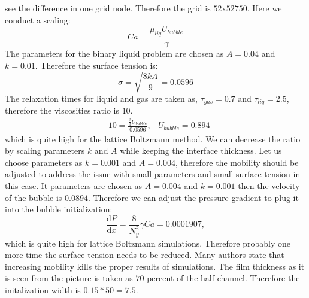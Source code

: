 \documentclass{article}
\begin{document}
see the difference in one grid node. Therefore the grid is $52\mathrm{x}52\mathrm{750}$. Here we
conduct a scaling:
\begin{equation}
Ca=\frac{\mu_{liq} U_{bubble}}{\gamma}
\end{equation}
The parameters for the binary liquid problem are chosen as $A=0.04$ and $k=0.01$. Therefore the
surface tension is:
\begin{equation}
\sigma = \sqrt{\frac{8 k A}{9}}=0.0596
\end{equation}
The relaxation times for liquid and gas are taken as, $\tau_{gas}=0.7$ and $\tau_{liq}=2.5$,
therefore the viscosities ratio is $10$.
\begin{equation}
\begin{aligned}
&10=\frac{\frac{2}{3} U_{bubble}}{0.0596},
&U_{bubble}=0.894
\end{aligned}
\end{equation}
which is quite high for the lattice Boltzmann method. We can decrease the ratio by scaling
parameters $k$ and $A$ while keeping the interface thickness. Let us choose parameters as $k=0.001$
and $A=0.004$, therefore the mobility should be adjusted to address the issue with small parameters
and small surface tension in this case. It parameters are chosen as $A=0.004$ and $k=0.001$ then
the velocity of the bubble is  $0.0894$. Therefore we can adjust the pressure gradient to plug it
into the bubble initialization:
\begin{equation}
\frac{\mathrm{d}P}{\mathrm{d}x}=\frac{8}{N_y^2} \gamma Ca=0.0001907,
\end{equation}
which is quite high for lattice Boltzmann simulations. Therefore probably one more time the surface
tension needs to be reduced. {\color{red} Many authors state that increasing mobility kills the
proper results of simulations}. 
The film thickness as it is seen from the picture is taken as $70$ percent of the half channel.
Therefore the initalization width is $0.15*50=7.5$. 
\end{document}
